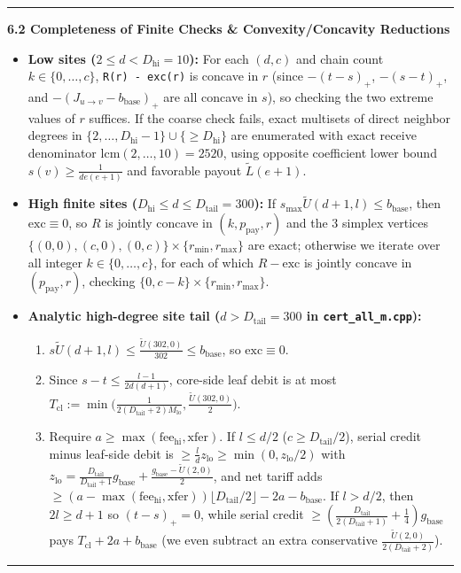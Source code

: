 \documentclass[11pt]{article}
\theoremstyle{remark}
\numberwithin{equation}{section}
\newcommand{\trhead}[1]{\par\smallskip\noindent\textbf{#1}\par\nopagebreak\smallskip}
\newenvironment{transcription}{\par\medskip\noindent\rule{\linewidth}{0.4pt}\par\nopagebreak}{\par\nopagebreak\noindent\rule{\linewidth}{0.4pt}\par\medskip}
\begin{document}
\begin{transcription}
\trhead{6.2 Completeness of Finite Checks \& Convexity/Concavity Reductions}
\begin{itemize}
\item \textbf{Low sites ($2 \le d < D_{\mathrm{hi}} = 10$):} For each $(d, c)$ and chain count $k \in \{0, \dots, c\}$, \texttt{R(r) - exc(r)} is concave in $r$ (since $-(t-s)_+$, $-(s-t)_+$, and $-(J_{u \to v} - b_{\mathrm{base}})_+$ are all concave in $s$), so checking the two extreme values of $r$ suffices. If the coarse check fails, exact multisets of direct neighbor degrees in $\{2, \dots, D_{\mathrm{hi}}-1\} \cup \{\ge D_{\mathrm{hi}}\}$ are enumerated with exact receive denominator $\mathrm{lcm}(2, \dots, 10) = 2520$, using opposite coefficient lower bound $s(v) \ge \frac{1}{d e(e+1)}$ and favorable payout $\widetilde{L}(e+1)$.
\item \textbf{High finite sites ($D_{\mathrm{hi}} \le d \le D_{\mathrm{tail}} = 300$):} If $s_{\max}\widetilde{U}(d+1, l) \le b_{\mathrm{base}}$, then $\mathrm{exc} \equiv 0$, so $R$ is jointly concave in $(k, p_{\mathrm{pay}}, r)$ and the 3 simplex vertices $\{(0,0), (c,0), (0,c)\} \times \{r_{\min}, r_{\max}\}$ are exact; otherwise we iterate over all integer $k \in \{0, \dots, c\}$, for each of which $R - \mathrm{exc}$ is jointly concave in $(p_{\mathrm{pay}}, r)$, checking $\{0, c-k\} \times \{r_{\min}, r_{\max}\}$.
\item \textbf{Analytic high-degree site tail ($d > D_{\mathrm{tail}} = 300$ in \texttt{cert\_all\_m.cpp}):}
\begin{enumerate}
\item $s\widetilde{U}(d+1, l) \le \frac{\widetilde{U}(302, 0)}{302} \le b_{\mathrm{base}}$, so $\mathrm{exc} \equiv 0$.
\item Since $s - t \le \frac{l-1}{2d(d+1)}$, core-side leaf debit is at most $T_{\mathrm{cl}} := \min\big(\frac{1}{2(D_{\mathrm{tail}}+2)M_{\mathrm{lo}}}, \frac{\widetilde{U}(302,0)}{2}\big)$.
\item Require $a \ge \max(\mathrm{fee}_{\mathrm{hi}}, \mathrm{xfer})$. If $l \le d/2$ ($c \ge D_{\mathrm{tail}}/2$), serial credit minus leaf-side debit is $\ge \frac{l}{d} z_{\mathrm{lo}} \ge \min(0, z_{\mathrm{lo}}/2)$ with $z_{\mathrm{lo}} = \frac{D_{\mathrm{tail}}}{D_{\mathrm{tail}}+1}g_{\mathrm{base}} + \frac{g_{\mathrm{base}} - \widetilde{U}(2,0)}{2}$, and net tariff adds $\ge (a - \max(\mathrm{fee}_{\mathrm{hi}}, \mathrm{xfer}))\lfloor D_{\mathrm{tail}}/2 \rfloor - 2a - b_{\mathrm{base}}$. If $l > d/2$, then $2l \ge d+1$ so $(t-s)_+ = 0$, while serial credit $\ge (\frac{D_{\mathrm{tail}}}{2(D_{\mathrm{tail}}+1)} + \frac{1}{4})g_{\mathrm{base}}$ pays $T_{\mathrm{cl}} + 2a + b_{\mathrm{base}}$ (we even subtract an extra conservative $\frac{\widetilde{U}(2,0)}{2(D_{\mathrm{tail}}+2)}$).

\end{enumerate}
\end{itemize}
\end{transcription}
\end{document}
